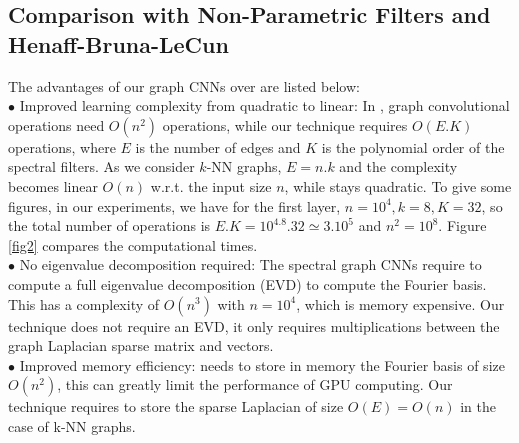 \documentclass{article}
\begin{document}
\subsection{Comparison with Non-Parametric Filters and Henaff-Bruna-LeCun \cite{art:HenaffBrunaLeCun15DLgraphs}}
\vspace{-0.2cm}
The advantages of our graph CNNs over \cite{art:HenaffBrunaLeCun15DLgraphs} are listed below:\\
$\bullet$ Improved learning complexity from quadratic to linear: In \cite{art:HenaffBrunaLeCun15DLgraphs}, graph convolutional operations need $O(n^2)$ operations, while our technique requires $O(E.K)$ operations, where $E$ is the number of edges and $K$ is the polynomial order of the spectral filters. As we consider $k$-NN graphs, $E=n.k$ and the complexity becomes linear $O(n)$ w.r.t. the input size $n$, while  \cite{art:HenaffBrunaLeCun15DLgraphs} stays quadratic. To give some figures, in our experiments, we have for the first layer, $n=10^4, k=8, K=32$, so the total number of operations is $E.K=10^4.8.32 \simeq 3.10^5$ and $n^2=10^8$. Figure \ref{fig2} compares the computational times.\\
$\bullet$  No eigenvalue decomposition required: The spectral graph CNNs \cite{art:HenaffBrunaLeCun15DLgraphs} require to compute a full eigenvalue decomposition (EVD) to compute the Fourier basis. This has a complexity of $O(n^3)$ with $n=10^{4}$, which is memory expensive. Our technique does not require an EVD, it only requires multiplications between the graph Laplacian sparse matrix and vectors. \\
$\bullet$ Improved memory efficiency: \cite{art:HenaffBrunaLeCun15DLgraphs} needs to store in memory the Fourier basis of size $O(n^2)$, this can greatly limit the performance of GPU computing. Our technique requires to store the sparse Laplacian of size $O(E)=O(n)$ in the case of k-NN graphs.





\end{document}
